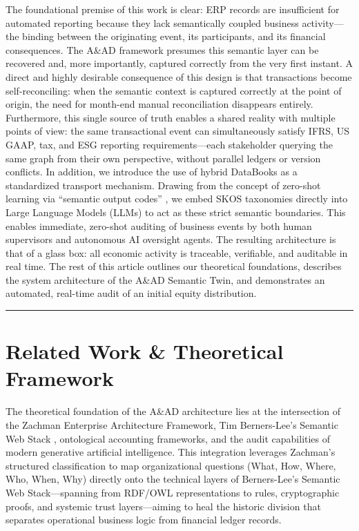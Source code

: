 \documentclass[12pt, a4paper]{article}
\begin{document}
The foundational premise of this work is clear: ERP records are insufficient for automated reporting because they lack semantically coupled business activity---the binding between the originating event, its participants, and its financial consequences. The A\&AD framework presumes this semantic layer can be recovered and, more importantly, captured correctly from the very first instant. A direct and highly desirable consequence of this design is that transactions become self-reconciling: when the semantic context is captured correctly at the point of origin, the need for month-end manual reconciliation disappears entirely. Furthermore, this single source of truth enables a shared reality with multiple points of view: the same transactional event can simultaneously satisfy IFRS, US GAAP, tax, and ESG reporting requirements---each stakeholder querying the same graph from their own perspective, without parallel ledgers or version conflicts. In addition, we introduce the use of hybrid DataBooks \cite{cagle2026} as a standardized transport mechanism. Drawing from the concept of zero-shot learning via ``semantic output codes'' \cite{palatucci2009}, we embed SKOS taxonomies \cite{w3cskos} directly into Large Language Models (LLMs) to act as these strict semantic boundaries. This enables immediate, zero-shot auditing of business events by both human supervisors and autonomous AI oversight agents. The resulting architecture is that of a glass box: all economic activity is traceable, verifiable, and auditable in real time. The rest of this article outlines our theoretical foundations, describes the system architecture of the A\&AD Semantic Twin, and demonstrates an automated, real-time audit of an initial equity distribution.

\hrule
\vspace{1em}

\section{Related Work \& Theoretical Framework}

The theoretical foundation of the A\&AD architecture lies at the intersection of the Zachman Enterprise Architecture Framework, Tim Berners-Lee's Semantic Web Stack \cite{bernerslee2001}, ontological accounting frameworks, and the audit capabilities of modern generative artificial intelligence. This integration leverages Zachman's structured classification to map organizational questions (What, How, Where, Who, When, Why) directly onto the technical layers of Berners-Lee's Semantic Web Stack---spanning from RDF/OWL representations to rules, cryptographic proofs, and systemic trust layers---aiming to heal the historic division that separates operational business logic from financial ledger records.
\end{document}
